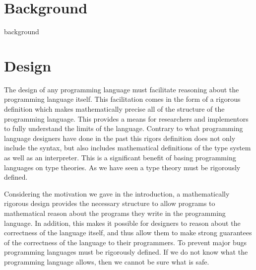 \documentclass[phd,appendix,dedicationpage,ackpage,epigraphpage]{uithesis}
\begin{document}
\part{Background}          
\label{part:background}
{background}

\part{Design}
\label{part:design}
The design of any programming language must facilitate reasoning about
the programming language itself.  This facilitation comes in the form
of a rigorous definition which makes mathematically precise all of the
structure of the programming language.  This provides a means for
researchers and implementors to fully understand the limits of the
language.  Contrary to what programming language designers have done
in the past this rigors definition does not only include the syntax,
but also includes mathematical definitions of the type system as well
as an interpreter. This is a significant benefit of basing programming
languages on type theories.  As we have seen a type theory must be
rigorously defined.  

Considering the motivation we gave in the introduction, a mathematically
rigorous design provides the necessary structure to allow programs to
mathematical reason about the programs they write in the programming
language.  In addition, this makes it possible for designers to reason
about the correctness of the language itself, and thus allow them to
make strong guarantees of the correctness of the language to their
programmers.  To prevent major bugs programming languages must be
rigorously defined.  If we do not know what the programming language
allows, then we cannot be sure what is safe.
\end{document}
